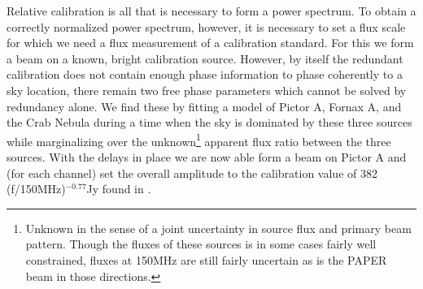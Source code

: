 \documentclass[preprint]{aastex}
\begin{document}
Relative calibration is all that is necessary to form a power spectrum. To obtain a correctly normalized power spectrum, however, it is necessary to set a flux scale for which we need a flux measurement of a calibration standard.  For this we form a beam on a known, bright calibration source.  However, by itself the redundant calibration does not contain enough phase information to phase coherently to a sky location, there remain two free phase parameters which cannot be solved by redundancy alone.   We find these by fitting a model of Pictor A, Fornax A, and the Crab Nebula during a time when the sky is dominated by these three sources while marginalizing over the unknown\footnote{Unknown in the sense of a joint uncertainty in source flux and primary beam pattern. Though the fluxes of these sources is in some cases fairly well constrained, fluxes at 150MHz are still fairly uncertain as is the PAPER beam in those directions.} apparent flux ratio between the three sources. With the delays in place we are now able form a beam on Pictor A and (for each channel) set the overall amplitude to the calibration value of 382 (f/150MHz)$^{-0.77}$Jy found in \cite{jacobs:2013b}.
  
\end{document}
